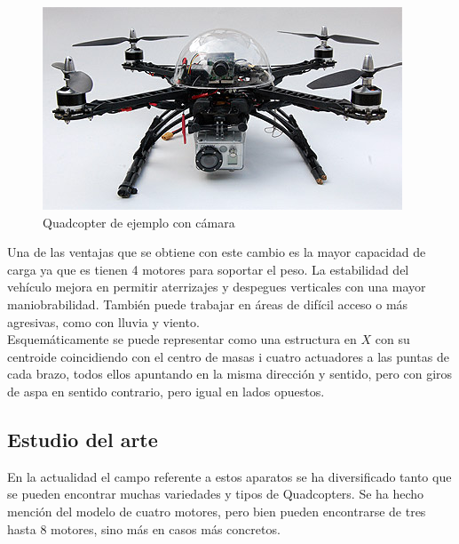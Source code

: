 \documentclass[twoside]{article}
\begin{document}
\begin{figure}[h!]
\begin{center}
\includegraphics[scale=0.4]{images/quadcopter_example.jpg}
\caption{Quadcopter de ejemplo con cámara}
\end{center}
\end{figure}


Una de las ventajas que se obtiene con este cambio es la mayor capacidad de carga ya que es tienen 4 motores  para soportar el peso. La estabilidad del vehículo mejora en permitir aterrizajes y despegues verticales con una mayor maniobrabilidad. También puede trabajar en áreas de difícil acceso o más agresivas, como con lluvia y viento. \\

Esquemáticamente se puede representar como una estructura en $X$ con su centroide coincidiendo con el centro de masas i cuatro actuadores a las puntas de cada brazo, todos ellos apuntando en la misma dirección y sentido, pero con giros de aspa en sentido contrario, pero igual en lados opuestos.


\subsection{Estudio del arte}

En la actualidad el campo referente a estos aparatos se ha diversificado tanto que se pueden encontrar muchas variedades y tipos de Quadcopters. Se ha hecho mención del modelo de cuatro motores, pero bien pueden encontrarse de tres hasta 8 motores, sino más en casos más concretos. \\
\end{document}
